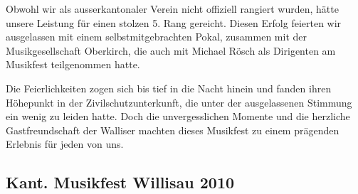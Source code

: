\begin{history}
    Obwohl wir als ausserkantonaler Verein nicht offiziell rangiert wurden,
    hätte unsere Leistung für einen stolzen 5. Rang gereicht. Diesen Erfolg
    feierten wir ausgelassen mit einem selbstmitgebrachten Pokal, zusammen mit
    der Musikgesellschaft Oberkirch, die auch mit Michael Rösch als Dirigenten
    am Musikfest teilgenommen hatte.

    Die Feierlichkeiten zogen sich bis tief in die Nacht hinein und fanden ihren
    Höhepunkt in der Zivilschutzunterkunft, die unter der ausgelassenen Stimmung
    ein wenig zu leiden hatte. Doch die unvergesslichen Momente und die
    herzliche Gastfreundschaft der Walliser machten dieses Musikfest zu einem
    prägenden Erlebnis für jeden von uns.

\end{history}

\subsection*{Kant. Musikfest Willisau 2010}

